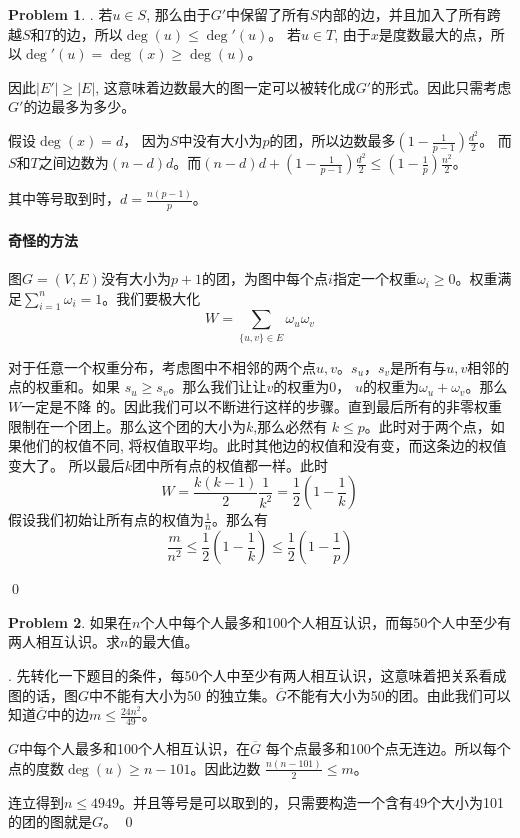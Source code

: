 \documentclass[UTF8]{ctexart}
\newenvironment{sol}
  {\par\vspace{3mm}\noindent{\it Solution}.}
  {\qed \\ \medskip}
\theoremstyle{definition}
\newtheorem{problem}{Problem}
\begin{document}
\begin{problem}
\begin{sol}
  若$u \in S$, 那么由于$G'$中保留了所有$S$内部的边，并且加入了所有跨越$S$和$T$的边，所以$\deg(u) \leq \deg'(u)$。  
  若$u \in T$, 由于$x$是度数最大的点，所以$\deg'(u)=\deg(x) \geq \deg(u)$。

  因此$|E'| \geq |E|$, 这意味着边数最大的图一定可以被转化成$G'$的形式。因此只需考虑$G'$的边最多为多少。

  假设$\deg(x) = d$， 因为$S$中没有大小为$p$的团，所以边数最多$(1-\frac 1 {p-1})\frac {d^2} 2$。
  而$S$和$T$之间边数为$(n-d)d$。而$(n-d)d + (1-\frac 1 {p-1})\frac {d^2} 2 \leq (1-\frac 1 p)\frac {n^2} 2$。

  其中等号取到时，$d=\frac {n(p-1)} p$。

  \paragraph{奇怪的方法}

  图$G=(V,E)$没有大小为$p+1$的团，为图中每个点$i$指定一个权重$\omega_i \geq 0$。权重满足$\sum_{i=1}^n \omega_i=1$。我们要极大化
  $$
  W = \sum_{\{u,v\} \in E} \omega_{u} \omega_{v}
  $$

  对于任意一个权重分布，考虑图中不相邻的两个点$u,v$。$s_u，s_v$是所有与$u,v$相邻的点的权重和。如果
  $s_u \geq s_v$。那么我们让让$v$的权重为0， $u$的权重为$\omega_u + \omega_v$。那么$W$一定是不降
  的。因此我们可以不断进行这样的步骤。直到最后所有的非零权重限制在一个团上。那么这个团的大小为$k$,那么必然有
  $k \leq p$。此时对于两个点，如果他们的权值不同, 将权值取平均。此时其他边的权值和没有变，而这条边的权值变大了。
  所以最后$k$团中所有点的权值都一样。此时
  $$
  W = \frac {k(k-1)} 2 \frac 1 {k^2} = \frac 1 2 ({1 - \frac 1 k})
  $$
  假设我们初始让所有点的权值为$\frac 1 n$。那么有
  $$
  \frac m {n^2} \leq \frac 1 2 ({1 - \frac 1 k}) \leq \frac 1 2 ({1 - \frac 1 p})
  $$
  
\end{sol}
\end{problem}

\begin{problem}
如果在$n$个人中每个人最多和100个人相互认识，而每50个人中至少有两人相互认识。求$n$的最大值。
\begin{sol}
  先转化一下题目的条件，每50个人中至少有两人相互认识，这意味着把关系看成图的话，图$G$中不能有大小为50
  的独立集。$\overline G$不能有大小为50的团。由此我们可以知道$\overline G$中的边$m \leq \frac {24n^2} {49}$。
  
  $G$中每个人最多和100个人相互认识，在$\overline G$
  每个点最多和100个点无连边。所以每个点的度数$\deg(u) \geq n-101$。因此边数
  $\frac {n(n-101)} 2 \leq m$。

  连立得到$n \leq 4949$。并且等号是可以取到的，只需要构造一个含有$49$个大小为101的团的图就是$G$。
\end{sol}
\end{problem}
\end{document}
